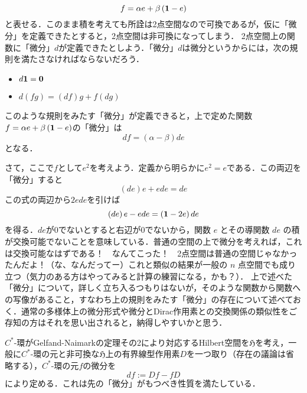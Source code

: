\[f=\alpha e+\beta \left({\bf 1}-e\right)\]
と表せる．このまま積を考えても所詮は2点空間なので可換であるが，仮に「微分」を定義できたとすると，2点空間は非可換になってしまう．
2点空間上の関数に「微分」$d$が定義できたとしよう．「微分」$d$は微分というからには，次の規則を満たさなければならないだろう．
\begin{itemize}
\item$d{\bf 1}={\bf 0}$
\item$d(fg)=\left(df\right)g+f\left(dg\right)$
\end{itemize}
このような規則をみたす「微分」が定義できると，上で定めた関数$f=\alpha e+\beta \left({\bf 1}-e\right)$の「微分」は
\[df=\left(\alpha-\beta\right)de\]
となる．

さて，ここで$f$として$e^2$を考えよう．定義から明らかに$e^2=e$である．この両辺を「微分」すると
\[\left(de\right)e+ede=de\] 
この式の両辺から$2ede$を引けば
\[\left(de\right)e-ede=\left({\bf 1}-2e\right)de\]
を得る．$de$が0でないとすると右辺が$0$でないから，関数 $e$ とその導関数 $de$ の積が交換可能でないことを意味している．普通の空間の上で微分を考えれば，これは交換可能なはずである！　なんてこった！　2点空間は普通の空間じゃなかったんだよ！（な、なんだってー）これと類似の結果が一般の $n$ 点空間でも成り立つ（気力のある方はやってみると計算の練習になる，かも？）．
上で述べた「微分」について，詳しく立ち入るつもりはないが，そのような関数から関数への写像があること，すなわち上の規則をみたす「微分」の存在について述べておく．通常の多様体上の微分形式や微分とDirac作用素との交換関係の類似性をご存知の方はそれを思い出されると，納得しやすいかと思う．

$C^*$-環がGelfand-Naimarkの定理その2により対応するHilbert空間を$\mathfrak{H}$を考え，一般に$C^*$-環の元と非可換な$\mathfrak{H}$上の有界線型作用素$D$を一つ取り（存在の議論は省略する），$C^*$-環の元$f$の微分を
\[df:=Df-fD\]
により定める．これは先の「微分」がもつべき性質を満たしている．

